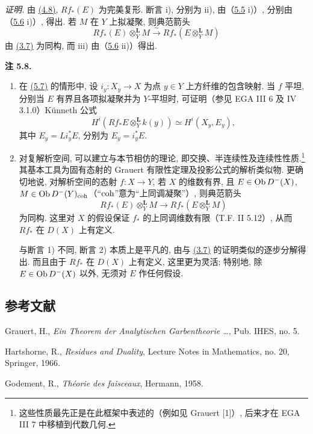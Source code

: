 \emph{证明.} 由 \hyperlink{sga6.e03.prop.4-8}{(4.8)}, \(Rf_*(E)\) 为完美复形. 断言 i), 分别为 ii), 由（\hyperlink{sga6.e03.lem.5-5}{5.5} i)）, 分别由（\hyperlink{sga6.e03.cor.5-6}{5.6} i)）, 得出. 若 \(M\) 在 \(Y\) 上拟凝聚, 则典范箭头
\[
 Rf_*(E)\otimes_Y^{\mathbf L}M
 \xrightarrow{\sim}
 Rf_*(E\otimes_Y^{\mathbf L}M)
\]
由 \hyperlink{sga6.e03.prop.3-7}{(3.7)} 为同构, 而 iii) 由（\hyperlink{sga6.e03.cor.5-6}{5.6} ii)）得出.

\newpage
{}\textbf{注 5.8.}\nopagebreak[4]
\begin{enumerate}[label=\alph*)]
\item 在 \hyperlink{sga6.e03.prop.5-7}{(5.7)} 的情形中, 设 \(i_y:X_y\to X\) 为点 \(y\in Y\) 上方纤维的包含映射. 当 \(f\) 平坦, 分别当 \(E\) 有界且各项拟凝聚并为 \(Y\)-平坦时, 可证明（参见 EGA III 6 及 IV 3.1.0）Künneth 公式
\[
 H^i(Rf_*E\otimes_Y^{\mathbf L}k(y))
 \simeq H^i(X_y,E_y),
\]
其中 \(E_y=Li_y^*E\), 分别为 \(E_y=i_y^*E\).
\item 对复解析空间, 可以建立与本节相仿的理论, 即交换、半连续性及连续性性质.\footnote{这些性质最先正是在此框架中表述的（例如见 Grauert [1]）, 后来才在 EGA III 7 中移植到代数几何.} 其基本工具为固有态射的 Grauert 有限性定理及投影公式的解析类似物. 更确切地说, 对解析空间的态射 \(f:X\to Y\), 若 \(X\) 的维数有界, 且 \(E\in\operatorname{Ob} D^{-}(X)\), \(M\in\operatorname{Ob} D^{-}(Y)_{\mathrm{coh}}\)（“\(\mathrm{coh}\)”意为“上同调凝聚”）, 则典范箭头
\[
 Rf_*(E)\otimes_Y^{\mathbf L}M
 \longrightarrow
 Rf_*(E\otimes_Y^{\mathbf L}M)
\]
为同构. 这里对 \(X\) 的假设保证 \(f_*\) 的上同调维数有限（T.F. II 5.12）, 从而 \(Rf_*\) 在 \(D(X)\) 上有定义.

与断言 1) 不同, 断言 2) 本质上是平凡的, 由与 \hyperlink{sga6.e03.prop.3-7}{(3.7)} 的证明类似的逐步分解得出. 而且由于 \(Rf_*\) 在 \(D(X)\) 上有定义, 这里更为灵活; 特别地, 除 \(E\in\operatorname{Ob} D^{-}(X)\) 以外, 无须对 \(E\) 作任何假设.
\end{enumerate}

\subsection*{参考文献}
\begin{enumerate}[label={[\arabic*]}]
\item[{[1]}] Grauert, H., \emph{Ein Theorem der Analytischen Garbentheorie \ldots}, Pub. IHES, no. 5.
\item[{[H]}] Hartshorne, R., \emph{Residues and Duality}, Lecture Notes in Mathematics, no. 20, Springer, 1966.
\item[{[T.F]}] Godement, R., \emph{Théorie des faisceaux}, Hermann, 1958.
\end{enumerate}



